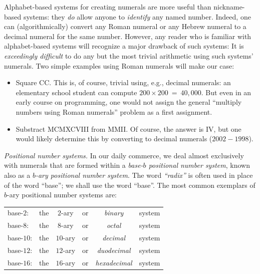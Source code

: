\medskip

Alphabet-based systems for creating numerals are more useful than
nickname-based systems: they {\em do} allow anyone to {\em identify}
any named number. Indeed, one can (algorithmically) convert any Roman
numeral or any Hebrew numeral to a decimal numeral for the same
number.  However, any reader who is familiar with alphabet-based
systems will recognize a major drawback of such systems: It is {\em
  exceedingly difficult} to do any but the most trivial arithmetic
using such systems' numerals.  Two simple examples using Roman
numerals will make our case:
\begin{itemize}
\item
Square CC.  This is, of course, trivial using, e.g., decimal numerals:
an elementary school student can compute $200 \times 200 \ =
\ 40,000$.  But even in an early course on programming, one would not
assign the general ``multiply numbers using Roman numerals'' problem
as a first assignment.

\item
Substract MCMXCVIII from MMII.  Of course, the answer is IV, but one
would likely determine this by converting to decimal numerals
($2002-1998$).
\end{itemize}

\noindent
{\it Positional number systems.}
%
In our daily commerce, we deal almost exclusively with numerals that
are formed within a {\it base-$b$ positional number system},
 known also as
a {\it $b$-ary positional number system}.
The word {\it ``radix''} is often used in place of the word ``base'';
we shall use the word ``base''.  The most common exemplars of $b$-ary
positional number systems are:

\smallskip

\begin{tabular}{llclcl}
base-$2$:  & the & $2$-ary  & or & {\em binary}      & system \\
base-$8$:  & the & $8$-ary  & or & {\em octal}       & system \\
base-$10$: & the & $10$-ary & or & {\em decimal}     & system \\
base-$12$: & the & $12$-ary & or & {\em duodecimal}  & system \\
base-$16$: & the & $16$-ary & or & {\em hexadecimal} & system
\end{tabular}

